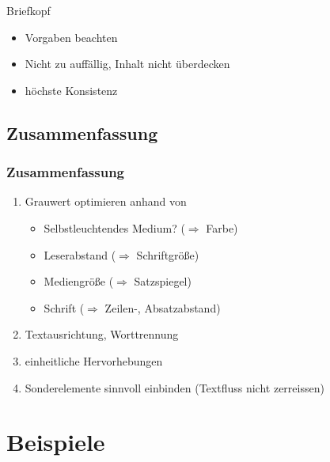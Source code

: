 \begin{frame}{Briefkopf}
  \begin{itemize}
  \item Vorgaben beachten
  \item Nicht zu auffällig, Inhalt nicht überdecken
  \item höchste Konsistenz
  \end{itemize}
\end{frame}


\subsection{Zusammenfassung}
\begin{frame}
  \frametitle<presentation>{Zusammenfassung}
  \begin{enumerate}
    \item Grauwert optimieren anhand von
      \begin{itemize}
        \item Selbstleuchtendes Medium? ($\Rightarrow$ Farbe)
        \item Leserabstand ($\Rightarrow$ Schriftgröße)
        \item Mediengröße ($\Rightarrow$ Satzspiegel)
        \item Schrift ($\Rightarrow$ Zeilen-, Absatzabstand)
      \end{itemize}
    \item Textausrichtung, Worttrennung
    \item einheitliche Hervorhebungen
    \item Sonderelemente sinnvoll einbinden (Textfluss nicht
      zerreissen)
  \end{enumerate}
\end{frame}



\appendix
\section{Beispiele}

